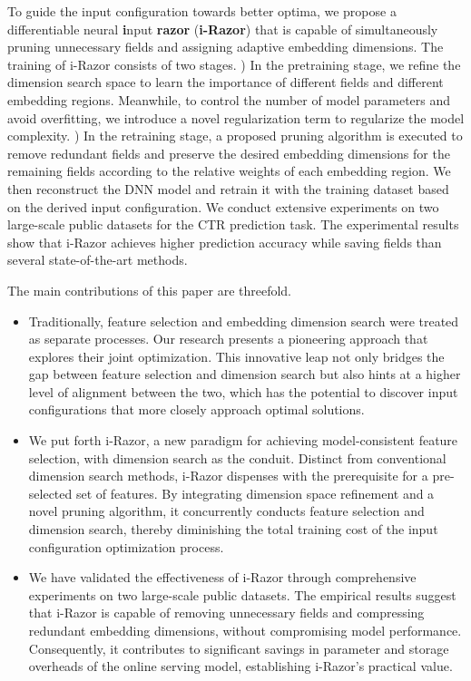 \documentclass[10pt,journal,compsoc]{IEEEtran}
\begin{document}
To guide the input configuration towards better optima, we propose a differentiable neural \textbf{i}nput \textbf{razor} (\textbf{i-Razor}) that is capable of simultaneously pruning unnecessary fields and assigning adaptive embedding dimensions. 
The training of i-Razor consists of two stages. ) In the pretraining stage, we refine the dimension search space to learn the importance of different fields and different embedding regions. Meanwhile, to control the number of model parameters and avoid overfitting, we introduce a novel regularization term to regularize the model complexity. ) In the retraining stage, a proposed pruning algorithm is executed to remove redundant fields and preserve the desired embedding dimensions for the remaining fields according to the relative weights of each embedding region. We then reconstruct the DNN model and retrain it with the training dataset based on the derived input configuration.
We conduct extensive experiments on two large-scale public datasets for the CTR prediction task.
The experimental results show that i-Razor achieves higher prediction accuracy while saving fields than several state-of-the-art methods.

The main contributions of this paper are threefold.
\begin{itemize}
\item {
Traditionally, feature selection and embedding dimension search were treated as separate processes. Our research presents a pioneering approach that explores their joint optimization. This innovative leap  not only bridges the gap between feature selection and dimension search but also hints at a higher level of alignment between the two, which has the potential to discover input configurations that more closely approach optimal solutions.} 
\item {We put forth i-Razor, a new paradigm for achieving model-consistent feature selection, with dimension search as the conduit. Distinct from conventional dimension search methods, i-Razor dispenses with the prerequisite for a pre-selected set of features. By integrating dimension space refinement and a novel pruning algorithm, it concurrently conducts feature selection and dimension search, thereby diminishing the total training cost of the input configuration optimization process.}
\item We have validated the effectiveness of i-Razor through comprehensive experiments on two large-scale public datasets. The empirical results suggest that i-Razor is capable of removing unnecessary fields  and compressing redundant embedding dimensions, without compromising model performance. 
{Consequently, it contributes to significant savings in parameter and storage overheads of the online serving model, establishing i-Razor's practical value.} 
\end{itemize}
\end{document}
